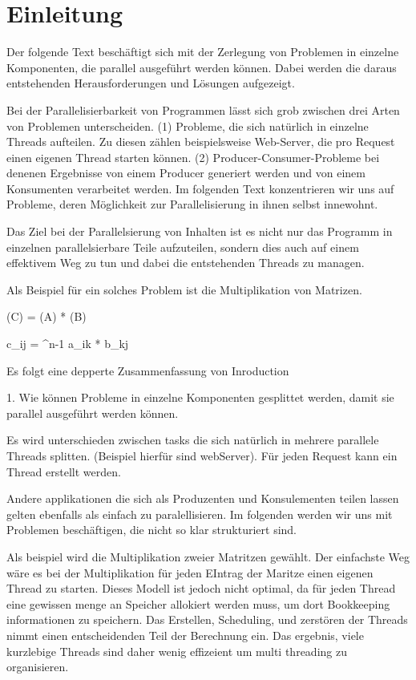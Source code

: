 \section{Einleitung}


Der folgende Text beschäftigt sich mit der Zerlegung von Problemen in einzelne Komponenten, die parallel ausgeführt werden können. Dabei werden die daraus entstehenden Herausforderungen und Lösungen aufgezeigt.

Bei der Parallelisierbarkeit von Programmen lässt sich grob zwischen drei Arten von Problemen unterscheiden. (1) Probleme, die sich natürlich in einzelne Threads aufteilen. Zu diesen zählen beispielsweise Web-Server, die pro Request einen eigenen Thread starten können. (2) Producer-Consumer-Probleme bei denenen Ergebnisse von einem Producer generiert werden und von einem Konsumenten verarbeitet werden. Im folgenden Text konzentrieren wir uns auf Probleme, deren Möglichkeit zur Parallelisierung in ihnen selbst innewohnt.

Das Ziel bei der Parallelsierung von Inhalten ist es nicht nur das Programm in einzelnen parallelsierbare Teile aufzuteilen, sondern dies auch auf einem effektivem Weg zu tun und dabei die entstehenden Threads zu managen.

Als Beispiel für ein solches Problem ist die Multiplikation von Matrizen.

(C) = (A) * (B)

c_ij = ^{n-1} a_ik * b_kj









Es folgt eine depperte Zusammenfassung von Inroduction


1. Wie können Probleme in einzelne Komponenten gesplittet werden, damit sie parallel ausgeführt werden können.


Es wird unterschieden zwischen tasks die sich natürlich in mehrere parallele Threads splitten. (Beispiel hierfür sind webServer). Für jeden Request kann ein Thread erstellt werden.

Andere applikationen die sich als Produzenten und Konsulementen teilen lassen gelten ebenfalls als einfach zu paralellisieren. Im folgenden werden wir uns mit Problemen beschäftigen, die nicht so klar strukturiert sind.

Als beispiel wird die Multiplikation zweier Matritzen gewählt. Der einfachste Weg wäre es bei der Multiplikation für jeden EIntrag der Maritze einen eigenen Thread zu starten. Dieses Modell ist jedoch nicht optimal, da für jeden Thread eine gewissen menge an Speicher allokiert werden muss, um dort Bookkeeping informationen zu speichern. Das Erstellen, Scheduling, und zerstören der Threads nimmt einen entscheidenden Teil der Berechnung ein. Das ergebnis, viele kurzlebige Threads sind daher wenig effizeient um multi threading zu organisieren.


